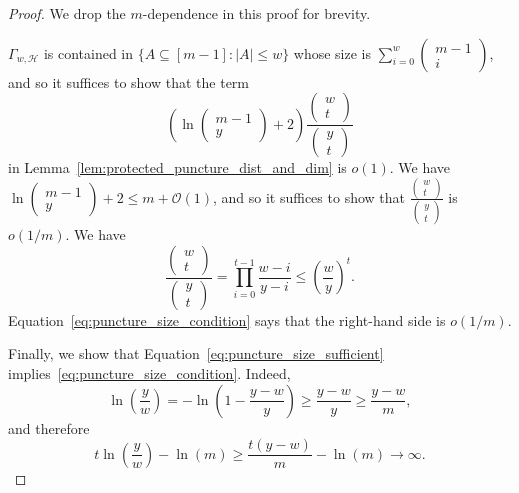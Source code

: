 \documentclass{article}
\begin{document}
\begin{proof}
    We drop the $m$-dependence in this proof for brevity.
    
    $\Gamma_{w,\mathcal{H}}$ is contained in $\{A \subseteq [m-1]: |A| \leq w\}$ whose size is $\sum_{i=0}^w\left(\begin{smallmatrix}m-1\\i\end{smallmatrix}\right)$, and so it suffices to show that the term
    \begin{equation}
        \left(\ln\begin{pmatrix}
            m-1\\y
        \end{pmatrix}+2\right)\frac{\begin{pmatrix}
            w\\t
        \end{pmatrix}}{\begin{pmatrix}
            y\\t
        \end{pmatrix}}
    \end{equation}
    in Lemma~\ref{lem:protected_puncture_dist_and_dim} is $o(1)$. We have $\ln\left(\begin{smallmatrix}m-1\\y\end{smallmatrix}\right) + 2 \leq m + \mathcal{O}(1)$, and so it suffices to show that $\frac{\left(\begin{smallmatrix}w\\t\end{smallmatrix}\right)}{\left(\begin{smallmatrix}y\\t\end{smallmatrix}\right)}$ is $o(1/m)$. We have
    \begin{equation}
        \frac{\begin{pmatrix}
            w\\t
        \end{pmatrix}}{\begin{pmatrix}
            y\\t
        \end{pmatrix}} = \prod_{i=0}^{t-1}\frac{w-i}{y-i}\leq\left(\frac{w}{y}\right)^t.
    \end{equation}
    Equation~\eqref{eq:puncture_size_condition} says that the right-hand side is $o(1/m)$.

    Finally, we show that Equation~\eqref{eq:puncture_size_sufficient} implies~\eqref{eq:puncture_size_condition}. Indeed,
    \begin{equation}
        \ln\left(\frac{y}{w}\right) = -\ln\left(1-\frac{y-w}{y}\right) \geq \frac{y-w}{y} \geq \frac{y-w}{m},
    \end{equation}
    and therefore
    \begin{equation}
        t\ln\left(\frac{y}{w}\right) - \ln(m) \geq \frac{t(y-w)}{m} - \ln(m) \to \infty.
    \end{equation}
\end{proof}
\end{document}
